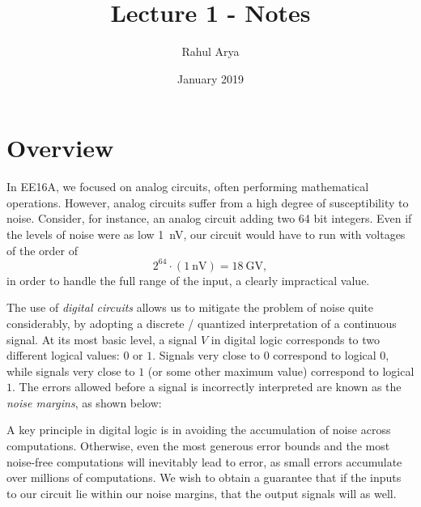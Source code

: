 \documentclass[letterpaper]{article}
\title{Lecture 1 - Notes}
\author{Rahul Arya}
\date{January 2019}
\theoremstyle{remark}
\begin{document}
\maketitle

\section{Overview}
In EE16A, we focused on analog circuits, often performing mathematical operations. However, analog circuits suffer from a high degree of susceptibility to noise. Consider, for instance, an analog circuit adding two 64 bit integers. Even if the levels of noise were as low \SI{1}{\nano\volt}, our circuit would have to run with voltages of the order of
\[
    2^{64} \cdot (\SI{1}{\nano\volt}) = \SI{18}{\giga\volt},
\]
in order to handle the full range of the input, a clearly impractical value.

The use of \emph{digital circuits} allows us to mitigate the problem of noise quite considerably, by adopting a discrete / quantized interpretation of a continuous signal. At its most basic level, a signal $V$ in digital logic corresponds to two different logical values: $0$ or $1$. Signals very close to $0$ correspond to logical $0$, while signals very close to $1$ (or some other maximum value) correspond to logical $1$. The errors allowed before a signal is incorrectly interpreted are known as the \emph{noise margins}, as shown below:  
\begin{center}
\end{center}

A key principle in digital logic is in avoiding the accumulation of noise across computations. Otherwise, even the most generous error bounds and the most noise-free computations will inevitably lead to error, as small errors accumulate over millions of computations. We wish to obtain a guarantee that if the inputs to our circuit lie within our noise margins, that the output signals will as well.
\end{document}
